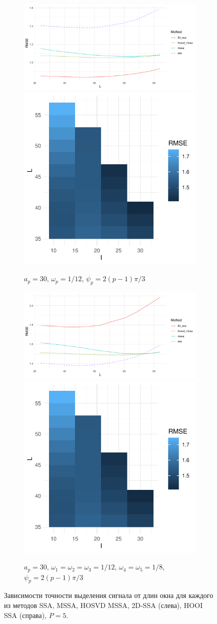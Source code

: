 \documentclass[specialist,
    substylefile = spbu_report.rtx,
    subf,href,colorlinks=true, 12pt]{disser}
\theoremstyle{plain}
\theoremstyle{definition}
\theoremstyle{remark}
\begin{document}
\begin{figure}
\begin{subfigure}{.95\linewidth}
        \end{subfigure} \par\medskip
        \begin{subfigure}{.95\linewidth}
            \includegraphics[width=.66\linewidth]{five-series-third}\hfill
            \includegraphics[width=.34\linewidth]{five-series-third_hooi}
            \caption{$a_p = 30$, $\omega_p=1/12$, $\psi_p=2(p-1)\pi/3$}
        \end{subfigure} \par\medskip
        \begin{subfigure}{.95\linewidth}
            \includegraphics[width=.66\linewidth]{five-series-fourth}\hfill
            \includegraphics[width=.34\linewidth]{five-series-fourth_hooi}
            \caption{$a_p = 30$, $\omega_1=\omega_2=\omega_3=1/12$, $\omega_4=\omega_5=1/8$, $\psi_p=2(p-1)\pi/3$}
        \end{subfigure}
        \caption{Зависимости точности выделения сигнала от длин окна для каждого из методов
        SSA, MSSA, HOSVD MSSA, 2D-SSA (слева), HOOI SSA (справа), $P=5$.}
        \label{fig:five-series-example}
    \end{figure}
\end{document}
